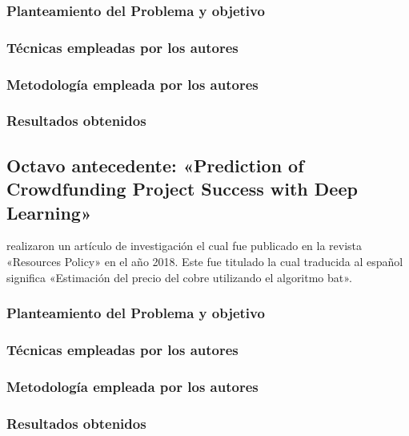 \subsubsection{Planteamiento del Problema y objetivo }


\subsubsection{Técnicas empleadas por los autores}
 

\subsubsection{Metodología empleada por los autores}


\subsubsection{Resultados obtenidos}



\subsection{Octavo antecedente: «Prediction of Crowdfunding Project Success with Deep Learning» \citep*{pr_yu2018deeplearning}}
\citeauthor{pr_yu2018deeplearning} realizaron un artículo de investigación el cual fue publicado en la revista «Resources Policy» en el año 2018. Este fue titulado  la cual traducida al español significa «Estimación del precio del cobre utilizando el algoritmo bat».

\subsubsection{Planteamiento del Problema y objetivo }


\subsubsection{Técnicas empleadas por los autores}


\subsubsection{Metodología empleada por los autores}


\subsubsection{Resultados obtenidos}



